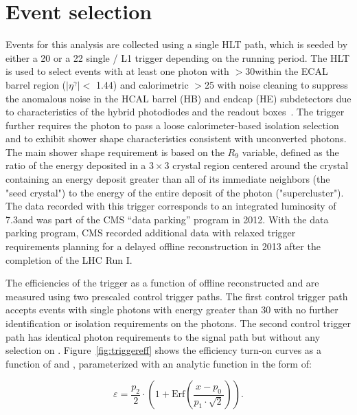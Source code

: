 \section{Event selection}
\label{sec:event_selection}
Events for this analysis are collected using a single HLT path, which is seeded by either a 20 \GeV or a 22 \GeV single \Pe/\Pgg\xspace L1 trigger depending on the running period. The HLT is used to select events with at least one photon with \et$ > 30$\GeV within the ECAL barrel region ($|\eta^{\gamma}| < $ 1.44) and calorimetric \met $ > $25 \GeV with noise cleaning to suppress the anomalous noise in the HCAL barrel (HB) and endcap (HE) subdetectors due to characteristics of the hybrid photodiodes and the readout boxes~\cite{hcalnoise}. The trigger further requires the photon to pass a loose calorimeter-based isolation selection and to exhibit shower shape characteristics consistent with unconverted photons. The main shower shape requirement is based on the $R_{9}$ variable, defined as the ratio of the energy deposited in a $3\times 3$ crystal region centered around the crystal containing an energy deposit greater than all of its immediate neighbors (the "seed crystal")  to the energy of the entire deposit of the photon ("supercluster"). The data recorded with this trigger corresponds to an integrated luminosity of 7.3\fbinv and was part of the CMS ``data parking'' program in 2012. With the data parking program, CMS recorded additional data with relaxed trigger requirements planning for a delayed offline reconstruction in 2013 after the completion of the LHC Run I. %

 The efficiencies of the trigger as a function of offline reconstructed \etg and \met are measured using two prescaled control trigger paths. The first control trigger path accepts events with single photons with energy greater than 30 \GeV with no further identification or isolation requirements on the photons. The second control trigger path has identical photon requirements to the signal path but without any selection on \met. Figure~\ref{fig:triggereff} shows the efficiency turn-on curves as a function of \etg and \met, parameterized with an analytic function in the form of:

\begin{equation}                                                                                                                                                                  
\label{eq:acc}                                                                                                                                                                    
        \varepsilon = \frac{p_2}{2} \cdot \left( 1 + \text{Erf}\left(\frac{x - p_0}{p_1 \cdot \sqrt{2}}\right)\right).
\end{equation}            

